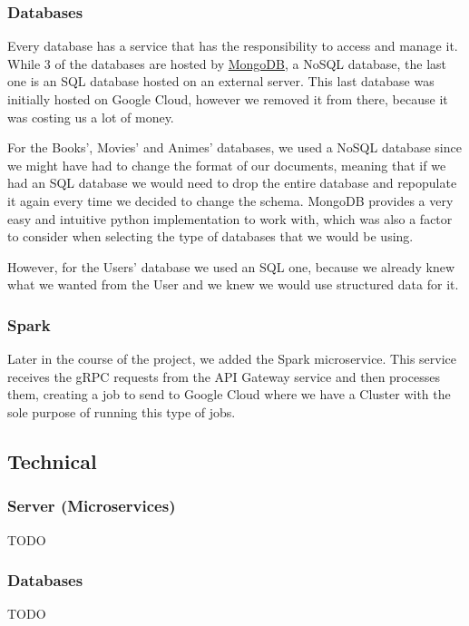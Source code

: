 \documentclass[oneside]{article}
\newcommand*\fpar{\hspace{1ex}}
\begin{document}
    \subsubsection{Databases}
    \fpar Every database has a service that has the responsibility to access and manage it. While 3 of the databases are hosted by \href{https://www.mongodb.com/}{MongoDB}, a NoSQL database, the last one is an SQL database hosted on an external server. This last database was initially hosted on Google Cloud, however we removed it from there, because it was costing us a lot of money.
    \par For the Books', Movies' and Animes' databases, we used a NoSQL database since we might have had to change the format of our documents, meaning that if we had an SQL database we would need to drop the entire database and repopulate it again every time we decided to change the schema. MongoDB provides a very easy and intuitive python implementation to work with, which was also a factor to consider when selecting the type of databases that we would be using.
    \par However, for the Users' database we used an SQL one, because we already knew what we wanted from the User and we knew we would use structured data for it.

    \subsubsection{Spark}
    \fpar Later in the course of the project, we added the Spark microservice. This service receives the gRPC requests from the API Gateway service and then processes them, creating a job to send to Google Cloud where we have a Cluster with the sole purpose of running this type of jobs.

  \subsection{Technical}

    \subsubsection{Server (Microservices)}
    \fpar TODO

    \subsubsection{Databases}
    \fpar TODO
\end{document}
